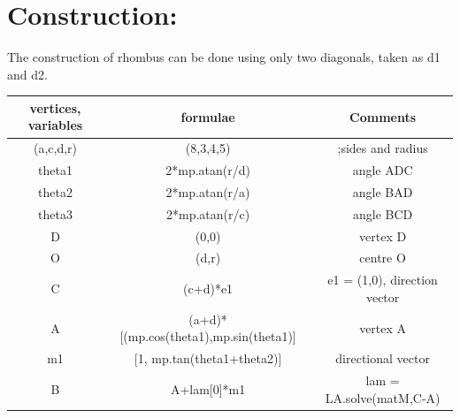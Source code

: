 \documentclass[a4paper,12pt,twocolumn]{article}
\begin{document}
\section{Construction:}
The construction of rhombus can be done using only two diagonals, taken as d1 and d2.
\begin{table}
	\centering
\setlength\extrarowheight{2pt}
	\begin{tabular}{|c|c|c|}
		\hline
		\textbf{vertices, variables} & \textbf{formulae} & \textbf{Comments}\\
		\hline
		(a,c,d,r) & (8,3,4,5) & ;sides and radius\\
		\hline
		theta1 & 2*mp.atan(r/d) & angle ADC\\
		\hline
		theta2 & 2*mp.atan(r/a) & angle BAD\\
		\hline                   
		theta3 & 2*mp.atan(r/c) & angle BCD\\
		\hline
		D & (0,0) & vertex D\\
		\hline
		O & (d,r) & centre O\\
		\hline
		C & (c+d)*e1& e1 = (1,0), direction vector\\
		\hline
		A & (a+d)*[(mp.cos(theta1),mp.sin(theta1)] & vertex A\\
		\hline
		m1 & [1, mp.tan(theta1+theta2)] & directional vector\\
		\hline
		B  &  A+lam[0]*m1 & lam = LA.solve(matM,C-A)\\
		\hline
	\end{tabular}
\end{table}
\end{document}
